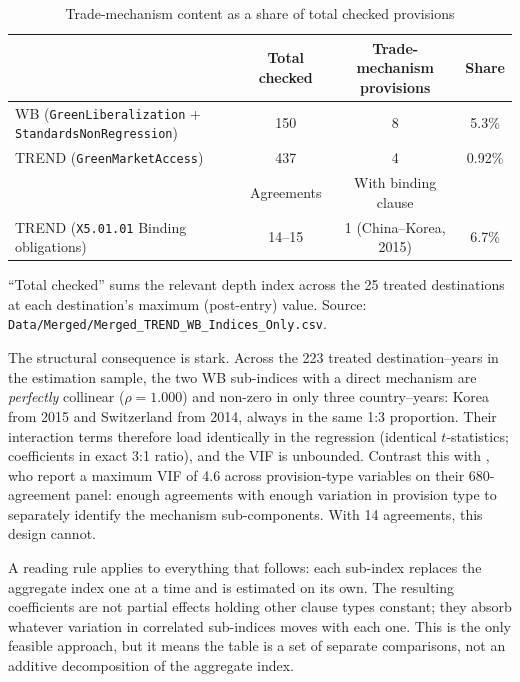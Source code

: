\documentclass[12pt]{article}
\begin{document}
\begin{table}[htbp]
\centering
\caption{Trade-mechanism content as a share of total checked provisions}
\label{tab:mechanism}
\small
\begin{threeparttable}
\begin{tabular}{lccc}
\toprule
 & Total checked & Trade-mechanism provisions & Share \\
\midrule
WB (\texttt{GreenLiberalization} + \texttt{StandardsNonRegression}) & 150 & 8 & 5.3\% \\
TREND (\texttt{GreenMarketAccess}) & 437 & 4 & 0.92\% \\
\midrule
 & Agreements & With binding clause & \\
\midrule
TREND (\texttt{X5.01.01} Binding obligations) & 14--15 & 1 (China--Korea, 2015) & 6.7\% \\
\bottomrule
\end{tabular}
\begin{tablenotes}\footnotesize
\item ``Total checked'' sums the relevant depth index across the 25 treated destinations
at each destination's maximum (post-entry) value. Source:
\texttt{Data/Merged/Merged\_TREND\_WB\_Indices\_Only.csv}.
\end{tablenotes}
\end{threeparttable}
\end{table}

The structural consequence is stark. Across the 223 treated destination--years in the
estimation sample, the two WB sub-indices with a direct mechanism are \emph{perfectly}
collinear ($\rho = 1.000$) and non-zero in only three country--years: Korea from 2015
and Switzerland from 2014, always in the same 1:3 proportion. Their interaction terms
therefore load identically in the regression (identical $t$-statistics; coefficients in
exact 3:1 ratio), and the VIF is unbounded. Contrast this with \citet{brandi2020}, who
report a maximum VIF of 4.6 across provision-type variables on their 680-agreement panel:
enough agreements with enough variation in provision type to separately identify the
mechanism sub-components. With 14 agreements, this design cannot.

A reading rule applies to everything that follows: each sub-index replaces the aggregate
index one at a time and is estimated on its own. The resulting coefficients are not
partial effects holding other clause types constant; they absorb whatever variation in
correlated sub-indices moves with each one. This is the only feasible approach, but it
means the table is a set of separate comparisons, not an additive decomposition of the
aggregate index.
\end{document}
